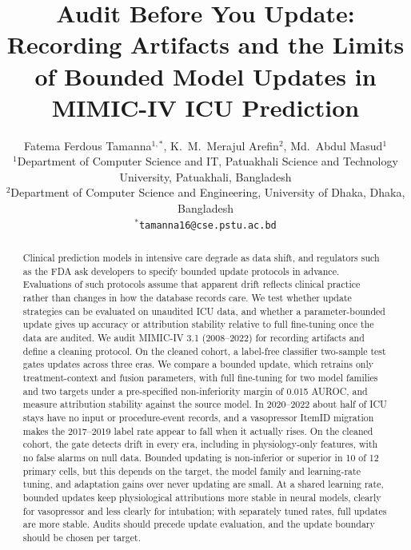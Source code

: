 \documentclass[10pt,a4paper,twocolumn]{article}
\title{\bfseries Audit Before You Update: Recording Artifacts and the Limits of Bounded Model Updates in MIMIC-IV ICU Prediction}
\author{Fatema Ferdous Tamanna$^{1,*}$, K.~M.~Merajul Arefin$^{2}$, Md.~Abdul Masud$^{1}$\\[0.5em]
	\small $^{1}$Department of Computer Science and IT, Patuakhali Science and Technology University, Patuakhali, Bangladesh\\
	\small $^{2}$Department of Computer Science and Engineering, University of Dhaka, Dhaka, Bangladesh\\
	\small $^{*}$\texttt{tamanna16@cse.pstu.ac.bd}}
\date{}
\begin{document}
	\raggedbottom
	\makeatletter
	\twocolumn[\begin{@twocolumnfalse}
		\maketitle
		\vspace{-1.5em}
	\end{@twocolumnfalse}]
	\makeatother
	
	
	\begin{abstract}
		Clinical prediction models in intensive care degrade as data shift, and regulators such as the FDA ask developers to specify bounded update protocols in advance. Evaluations of such protocols assume that apparent drift reflects clinical practice rather than changes in how the database records care. We test whether update strategies can be evaluated on unaudited ICU data, and whether a parameter-bounded update gives up accuracy or attribution stability relative to full fine-tuning once the data are audited. We audit MIMIC-IV 3.1 (2008--2022) for recording artifacts and define a cleaning protocol. On the cleaned cohort, a label-free classifier two-sample test gates updates across three eras. We compare a bounded update, which retrains only treatment-context and fusion parameters, with full fine-tuning for two model families and two targets under a pre-specified non-inferiority margin of 0.015 AUROC, and measure attribution stability against the source model. In 2020--2022 about half of ICU stays have no input or procedure-event records, and a vasopressor ItemID migration makes the 2017--2019 label rate appear to fall when it actually rises. On the cleaned cohort, the gate detects drift in every era, including in physiology-only features, with no false alarms on null data. Bounded updating is non-inferior or superior in 10 of 12 primary cells, but this depends on the target, the model family and learning-rate tuning, and adaptation gains over never updating are small. At a shared learning rate, bounded updates keep physiological attributions more stable in neural models, clearly for vasopressor and less clearly for intubation; with separately tuned rates, full updates are more stable. Audits should precede update evaluation, and the update boundary should be chosen per target.
	\end{abstract}
	{\let\thefootnote\relax{}}

\end{document}
